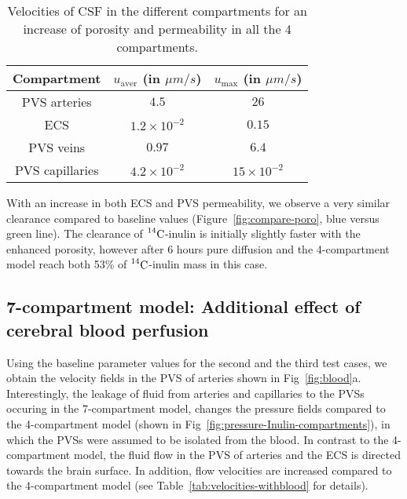 \documentclass[10pt]{article}
\newcommand{\1}{^{(1)}}
\newcommand{\2}{^{(2)}}
\newcommand{\Cinulin}{$\prescript{14}{}{\text{C}}$-inulin }
\begin{document}
\begin{table}[h!]
    \centering
    \begin{tabular}{c|c|c}
       Compartment & $u_\text{aver}$ (in $\si{\mu m/s}$) & $u_\text{max}$ (in $\si{\mu m/s}$) \\
       \hline
    
        PVS arteries & $4.5$ & $26$ \\
        ECS &  $1.2 \times 10^{-2}$ & $0.15 $ \\
        PVS veins & $0.97$ & $6.4$ \\
        PVS capillaries & $4.2\times 10^{-2}$ & $15 \times 10^{-2}$
    \end{tabular}
    \caption{Velocities of CSF in the different compartments for an increase of porosity and permeability in all the 4 compartments.}
    \label{tab:velocities-enhanced}
\end{table}
With an increase in both ECS and PVS permeability, we observe a very similar clearance compared to baseline values (Figure~\ref{fig:compare-poro}, blue versus green line). The clearance of \Cinulin is initially slightly faster with the enhanced porosity, however after 6 hours pure diffusion and the 4-compartment model reach both 53\% of \Cinulin mass in this case. 


\subsection{7-compartment model: Additional effect of cerebral blood perfusion}
Using the baseline parameter values for the second and the third test cases, we obtain the velocity fields in the PVS of arteries shown in Fig~\ref{fig:blood}a. Interestingly, the leakage of fluid from arteries and capillaries  to the PVSs  occuring in the 7-compartment model, changes the pressure fields compared to the 4-compartment model (shown in Fig~\ref{fig:pressure-Inulin-compartments}), in which the PVSs were assumed to be isolated from the blood. In contrast to the 4-compartment model, the fluid flow in the PVS of arteries and the ECS is directed towards the brain surface. In addition, flow velocities are increased compared to the 4-compartment model (see Table~\ref{tab:velocities-withblood} for details). 
\end{document}
